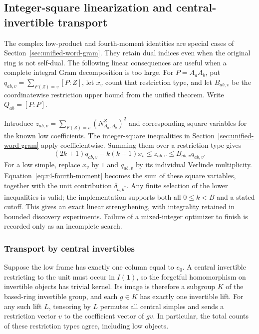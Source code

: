 \subsection{Integer-square linearization and central-invertible transport}
\label{sec:complex-low-fourth}
The complex low-product and fourth-moment identities are special cases
of Section~\ref{sec:unified-word-gram}. They retain dual indices even when
the original ring is not self-dual. The following linear consequences
are useful when a complete integral Gram decomposition is too large.
For $P=A_aA_b$, put $q_{ab,v}=\sum_{F(Z)=v}[P:Z]$, let $x_v$ count that
restriction type, and let $B_{ab,v}$ be the coordinatewise restriction
upper bound from the unified theorem. Write $Q_{ab}=[P:P]$.

Introduce $z_{ab,v}=\sum_{F(Z)=v}(N_{A_a,A_b}^Z)^2$ and corresponding
square variables for the known low coefficients. The integer-square inequalities in Section~\ref{sec:unified-word-gram}
apply coefficientwise. Summing them over a restriction type gives
\begin{equation}\label{eq:r4-square-cuts}
 (2k+1)q_{ab,v}-k(k+1)x_v\le z_{ab,v}
          \le B_{ab,v}q_{ab,v}.
\end{equation}
For a low simple, replace $x_v$ by $1$ and $q_{ab,v}$ by its individual
Verlinde multiplicity. Equation~\eqref{eq:r4-fourth-moment} becomes the sum
of these square variables, together with the unit contribution
$\delta_{a,b^*}$. Any finite selection of the lower inequalities is valid;
the implementation supports both all $0\le k<B$ and a stated cutoff.
This gives an exact linear strengthening, with integrality retained in
bounded discovery experiments. Failure of a mixed-integer optimizer to
finish is recorded only as an incomplete search.

\subsubsection{Transport by central invertibles}
Suppose the low frame has exactly one column equal to $e_0$.
A central invertible restricting to the unit must occur in $I(\mathbf1)$,
so the forgetful homomorphism on invertible objects has trivial kernel.
Its image is therefore a subgroup $K$ of the based-ring invertible group,
and each $g\in K$ has exactly one invertible lift.
For any such lift $L$, tensoring by $L$ permutes all central simples and sends
a restriction vector $v$ to the coefficient vector of $gv$. In particular,
the total counts of these restriction types agree, including low objects.

